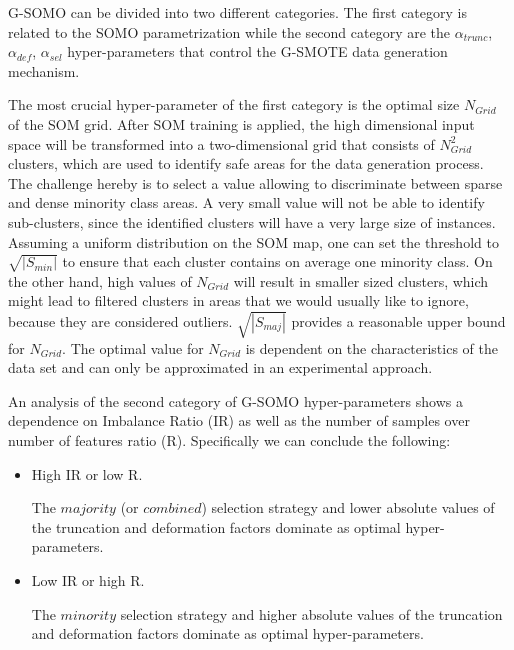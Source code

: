 \documentclass[parskip=full]{scrartcl}
\begin{document}
G-SOMO can be divided into two different categories. The first category is related to the SOMO parametrization while the second category are the $\alpha_{trunc}$, $\alpha_{def}$, $\alpha_{sel}$ hyper-parameters that control the G-SMOTE data generation mechanism.

The most crucial hyper-parameter of the first category is the optimal size $N_{Grid}$ of the SOM grid. After SOM training is applied, the high dimensional input space will be transformed into a two-dimensional grid that consists of $N_{Grid}^2$ clusters, which are used to identify safe areas for the data generation process. The challenge hereby is to select a value allowing to discriminate between sparse and dense minority class areas.  A very small value will not be able to identify sub-clusters, since the identified clusters will have a very large size of instances. Assuming a uniform distribution on the SOM map, one can set the threshold to $\sqrt{|S_{min}|}$ to ensure that each cluster contains on average one minority class. On the other hand, high values of $N_{Grid}$ will result in smaller sized clusters, which might lead to filtered clusters in areas that we would usually like to ignore, because they are considered outliers. $\sqrt{|S_{maj}|}$ provides a reasonable upper bound for $N_{Grid}$. The optimal value for $N_{Grid}$ is dependent on the characteristics of the data set and can only be approximated in an experimental approach.

An analysis of the second category of G-SOMO hyper-parameters shows a dependence on Imbalance Ratio (IR) as well as the number of samples over number of features ratio (R). Specifically we can conclude the following:

\begin{itemize}

	\renewcommand\labelitemi{--}

	\item High IR or low R.
	
	The $ majority $ (or $ combined $) selection strategy and lower absolute values of the truncation and deformation factors dominate as optimal hyper-parameters.

	\item Low IR or high R.
	
	The $ minority $ selection strategy and higher absolute values of the truncation and deformation factors dominate as optimal hyper-parameters.

\end{itemize}
\end{document}

